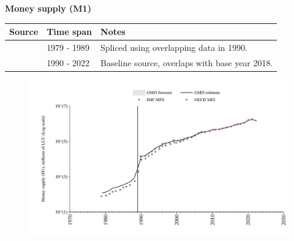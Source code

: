 \documentclass[12pt,a4paper,landscape]{article}
\begin{document}
\begin{adjustbox}{max totalsize={\paperwidth}{\paperheight},center}
\begin{minipage}[t][\textheight][t]{\textwidth}
\vspace*{0.5cm}
{}
\begin{center}
{\Large\bfseries Money supply (M1)}
\end{center}
\vspace{0.5cm}
\begin{table}[H]
\centering
\small
\begin{tabular}{|l|l|l|}
\hline
\textbf{Source} & \textbf{Time span} & \textbf{Notes} \\
\hline
\rowcolor{white}\cite{IMF_MFS}& 1979 - 1989 &Spliced using overlapping data in 1990. \\
\rowcolor{lightgray}\cite{OECD_MEI}& 1990 - 2022 &Baseline source, overlaps with base year 2018. \\
\hline
\end{tabular}
\end{table}
\begin{figure}[H]
\centering
\includegraphics[width=\textwidth,height=0.6\textheight,keepaspectratio]{graphs/POL_M1.pdf}
\end{figure}
\end{minipage}
\end{adjustbox}
\end{document}
